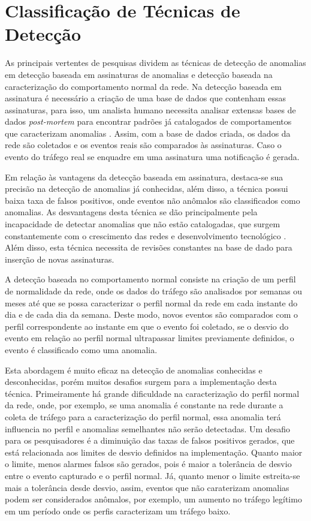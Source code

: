   \section{Classificação de Técnicas de Detecção}


\indent As principais vertentes de pesquisas dividem as técnicas de detecção de anomalias em detecção baseada em assinaturas de anomalias e detecção baseada na caracterização do comportamento normal da rede. Na detecção baseada em assinatura é necessário a criação de uma base de dados que contenham essas assinaturas, para isso, um analista humano necessita analisar extensas bases de dados \textit{post-mortem} para encontrar padrões já catalogados de comportamentos que caracterizam anomalias \cite{Silva2007}. Assim, com a base de dados criada, os dados da rede são coletados e os eventos reais são comparados às assinaturas. Caso o evento do tráfego real se enquadre em uma assinatura uma notificação é gerada.

\indent Em relação às vantagens da detecção baseada em assinatura, destaca-se sua precisão na detecção de anomalias já conhecidas, além disso, a técnica possui baixa taxa de falsos positivos, onde eventos não anômalos são classificados como anomalias. As desvantagens desta técnica se dão principalmente pela incapacidade de detectar anomalias que não estão catalogadas, que surgem constantemente com o crescimento das redes e desenvolvimento tecnológico \cite{Zarpelao2010}. Além disso, esta técnica necessita de revisões constantes na base de dado para inserção de novas assinaturas.

\indent A detecção baseada no comportamento normal consiste na criação de um perfil de normalidade da rede, onde os dados do tráfego são analisados por semanas ou meses até que se possa caracterizar o perfil normal da rede em cada instante do dia e de cada dia da semana. Deste modo, novos eventos são comparados com o perfil correspondente ao instante em que o evento foi coletado, se o desvio do evento em relação ao perfil normal ultrapassar limites previamente definidos, o evento é classificado como uma anomalia.

\indent Esta abordagem é muito eficaz na detecção de anomalias conhecidas e desconhecidas, porém muitos desafios surgem para a implementação desta técnica. Primeiramente há grande dificuldade na caracterização do perfil normal da rede, onde, por exemplo, se uma anomalia é constante na rede durante a coleta de tráfego para a caracterização do perfil normal, essa anomalia terá influencia no perfil e anomalias semelhantes não serão detectadas. Um desafio para os pesquisadores é a diminuição das taxas de falsos positivos gerados, que está relacionada aos limites de desvio definidos na implementação. Quanto maior o limite, menos alarmes falsos são gerados, pois é maior a tolerância de desvio entre o evento capturado e o perfil normal. Já, quanto menor o limite estreita-se mais a tolerância desde desvio, assim, eventos que não caraterizam anomalias podem ser considerados anômalos, por exemplo, um aumento no tráfego legítimo em um período onde os perfis caracterizam um tráfego baixo.

